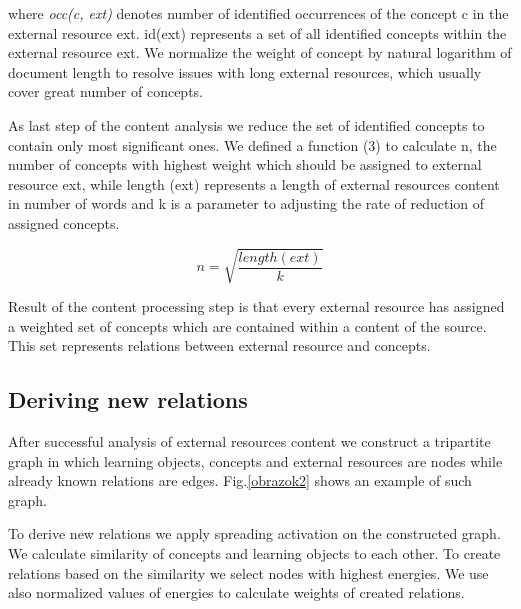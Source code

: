 \documentclass[a4, conference]{IEEEtran}
\begin{document}
where \textit{occ(c, ext)} denotes number of identified occurrences of the concept c in the external resource ext.  id(ext) represents a set of all identified concepts within the external resource ext. We normalize the weight of concept by natural logarithm of document length to resolve issues with long external resources, which usually cover great number of concepts.

As last step of the content analysis we reduce the set of identified concepts to contain only most significant ones. We defined a function (3) to calculate n, the number of concepts with highest weight which should be assigned to external resource ext, while length (ext) represents a length of external resources content in number of words and k is a parameter to adjusting the rate of reduction of assigned concepts.

\begin{equation}
n=\sqrt{\frac{length(ext)}{k}}
\end{equation}

Result of the content processing step is that every external resource has assigned a weighted set of concepts which are contained within a content of the source. This set represents relations between external resource and concepts. 
\subsection{Deriving new relations}%
% 
After successful analysis of external resources\textsc{} content we construct a tripartite graph in which learning objects, concepts and external resources are nodes while already known relations are edges. Fig.\ref{obrazok2} shows an example of such graph.

To derive new relations we apply spreading activation on the constructed graph. We calculate similarity of concepts and learning objects to each other. To create relations based on the similarity we select nodes with highest energies. We use also normalized values of energies to calculate weights of created relations.
\end{document}
